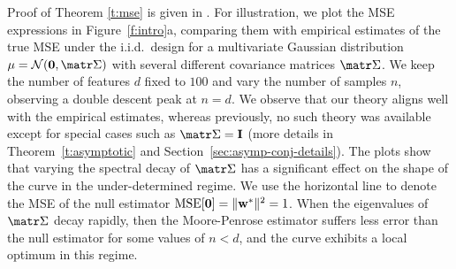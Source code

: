 \documentclass[../../thesis.tex]{subfiles}
\begin{document}
Proof of Theorem \ref{t:mse} is given in .
For illustration, we plot the MSE expressions in Figure~\ref{f:intro}a,
comparing them with empirical estimates of the true MSE under the
i.i.d.~design for a multivariate Gaussian distribution
$\mu=\Nc(\zero,\Sigmab)$ with several different covariance matrices $\Sigmab$. We keep the number of features $d$ fixed to
$100$ and vary the number of samples $n$, observing a double descent
peak at $n=d$. We observe that our theory aligns well with
the empirical estimates, whereas
previously, no such theory was available except for special
cases such as $\Sigmab=\I$ (more details in Theorem~\ref{t:asymptotic}
and Section~\ref{sec:asymp-conj-details}). The plots
show that varying the spectral decay of $\Sigmab$ has a significant effect on the
shape of the curve in the under-determined regime. We use the
horizontal line to denote the MSE of the null estimator
$\mathrm{MSE}[\mathbf 0]=\|\mathbf w^*\|^2=1$. When the eigenvalues of $\Sigmab$
decay rapidly, then the Moore-Penrose estimator suffers less error
than the null estimator for some values of $n<d$, and the curve
exhibits a local optimum in this regime.
\end{document}

